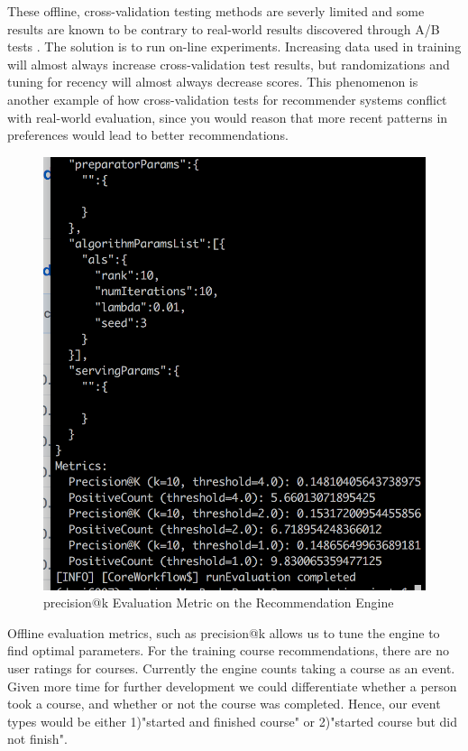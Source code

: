 \documentclass[12pt,journal]{IEEEtran}
\begin{document}
These offline, cross-validation testing methods are severly limited and some results are known to be contrary to real-world results discovered through A/B tests \cite{ActionMLAdvancedTuning}.  The solution is to run on-line experiments.  Increasing data used in training will almost always increase cross-validation test results, but randomizations and tuning for recency will almost always decrease scores.  This phenomenon is another example of how cross-validation tests for recommender systems conflict with real-world evaluation, since you would reason that more recent patterns in preferences would lead to better recommendations.

\begin{figure}[htbp]
\begin{center}
\includegraphics[width=1\columnwidth]{precision_at_k.png}
\end{center}
\caption{precision@k Evaluation Metric on the Recommendation Engine}
\label{fig:precision at k}
\end{figure}


Offline evaluation metrics, such as precision@k allows us to tune the engine to find optimal parameters.  For the training course recommendations, there are no user ratings for courses.  Currently the engine counts taking a course as an event.  Given more time for further development we could differentiate whether a person took a course, and whether or not the course was completed.  Hence, our event types would be either 1)"started and finished course" or 2)"started course but did not finish".
\end{document}
